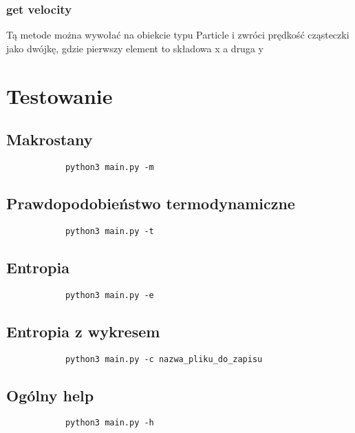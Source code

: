 \documentclass[]{article}
\begin{document}
		\subsubsection{get velocity}
			Tą metode można wywołać na obiekcie typu Particle i zwróci prędkość cząsteczki jako dwójkę, gdzie pierwszy element to składowa x a druga y

\pagebreak

\section{Testowanie}
	\subsection{Makrostany}
		\begin{lstlisting}
			python3 main.py -m
		\end{lstlisting}
	\subsection{Prawdopodobieństwo termodynamiczne}
		\begin{lstlisting}
			python3 main.py -t
		\end{lstlisting}
	\subsection{Entropia}
		\begin{lstlisting}
			python3 main.py -e
		\end{lstlisting}
	\subsection{Entropia z wykresem}
		\begin{lstlisting}
			python3 main.py -c nazwa_pliku_do_zapisu
		\end{lstlisting}
	\subsection{Ogólny help}
		\begin{lstlisting}
			python3 main.py -h
		\end{lstlisting}
	
\end{document}
